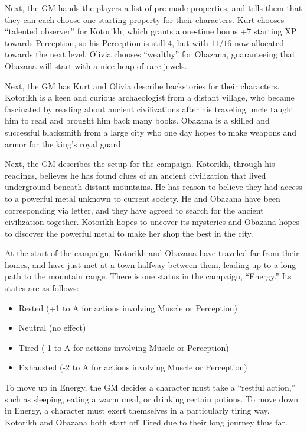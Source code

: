 \begin{example}
Next, the GM hands the players a list of pre-made properties, and tells them that they can each choose one starting property for their characters.
Kurt chooses ``talented observer'' for Kotorikh, which grants a one-time bonus $+7$ starting XP towards Perception, so his Perception is still $4$, but with $11/16$ now allocated towards the next level.
Olivia chooses ``wealthy'' for Obazana, guaranteeing that Obazana will start with a nice heap of rare jewels.

Next, the GM has Kurt and Olivia describe backstories for their characters.
Kotorikh is a keen and curious archaeologist from a distant village, who became fascinated by reading about ancient civilizations after his traveling uncle taught him to read and brought him back many books.
Obazana is a skilled and successful blacksmith from a large city who one day hopes to make weapons and armor for the king’s royal guard.

Next, the GM describes the setup for the campaign.
Kotorikh, through his readings, believes he has found clues of an ancient civilization that lived underground beneath distant mountains.
He has reason to believe they had access to a powerful metal unknown to current society.
He and Obazana have been corresponding via letter, and they have agreed to search for the ancient civilization together.
Kotorikh hopes to uncover its mysteries and Obazana hopes to discover the powerful metal to make her shop the best in the city.

At the start of the campaign, Kotorikh and Obazana have traveled far from their homes, and have just met at a town halfway between them, leading up to a long path to the mountain range.
There is one status in the campaign, ``Energy.'' Its states are as follows:
\begin{itemize}
\item Rested (+1 to A for actions involving Muscle or Perception)
\item Neutral (no effect)
\item Tired (-1 to A for actions involving Muscle or Perception)
\item Exhausted (-2 to A for actions involving Muscle or Perception)
\end{itemize}
To move up in Energy, the GM decides a character must take a ``restful action,'' such as sleeping, eating a warm meal, or drinking certain potions.
To move down in Energy, a character must exert themselves in a particularly tiring way.
Kotorikh and Obazana both start off Tired due to their long journey thus far.


\end{example}
